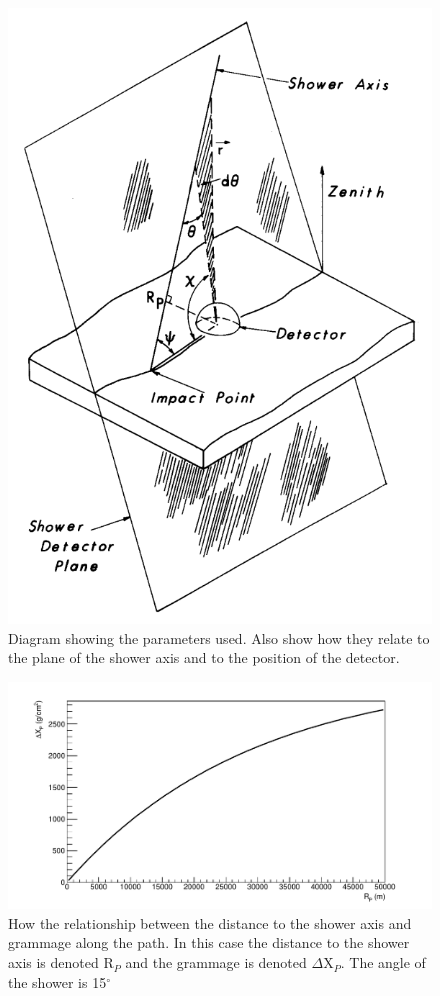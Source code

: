 \begin{figure}
\centering
\includegraphics[height=0.45\textheight]{chapters/pix/SelEff/ShowerPlane_and_Detector.png}
\caption{Diagram showing the parameters used. Also show how they relate to the plane of the shower axis and to the position of the detector.}
\end{figure}

\begin{figure}
\centering
\includegraphics[width=\textwidth]{chapters/graphs/SelectionEff/XpVsRp.pdf}
\caption{How the relationship between the distance to the shower axis and grammage along the path. In this case the distance to the shower axis is denoted R$_P$ and the grammage is denoted $\Delta$X$_P$. The angle of the shower is 15$^{\circ}$}
\end{figure}

